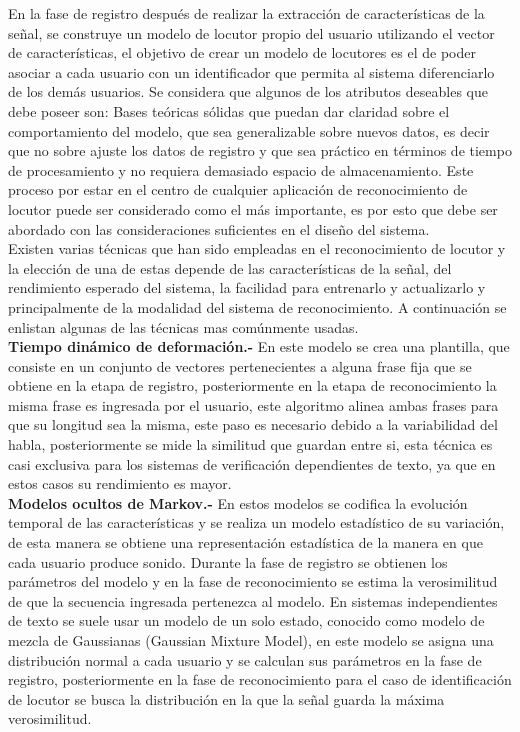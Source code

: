 En la fase de registro despu\'es de realizar la extracci\'on de caracter\'isticas de la señal, se construye un modelo de locutor propio del usuario utilizando el vector de caracter\'isticas, el objetivo de crear un modelo de locutores es el de poder asociar a cada usuario con un identificador que permita al sistema diferenciarlo de los dem\'as usuarios. Se considera que algunos de los atributos deseables que debe poseer son: Bases te\'oricas s\'olidas que puedan dar claridad sobre el comportamiento del modelo, que sea generalizable sobre nuevos datos, es decir que no sobre ajuste los datos de registro y que sea pr\'actico en t\'erminos de tiempo de procesamiento y no requiera demasiado espacio de almacenamiento. Este proceso por estar en el centro de cualquier aplicaci\'on de reconocimiento de locutor puede ser considerado como el m\'as importante, es por esto que debe ser abordado con las consideraciones suficientes en el diseño del sistema.\\

Existen varias t\'ecnicas que han sido empleadas en el reconocimiento de locutor y la elecci\'on de una de estas depende de las caracter\'isticas de la señal, del rendimiento esperado del sistema, la facilidad para entrenarlo y actualizarlo y principalmente de la modalidad del sistema de reconocimiento. A continuaci\'on se enlistan algunas de las t\'ecnicas mas com\'unmente usadas.\\

\textbf{Tiempo din\'amico de deformaci\'on.- } En este modelo se crea una plantilla, que consiste en un conjunto de vectores pertenecientes a alguna frase fija que se obtiene en la etapa de registro, posteriormente en la etapa de reconocimiento la misma frase es ingresada por el usuario, este algoritmo alinea ambas frases para que su longitud sea la misma, este paso es necesario debido a la variabilidad del habla, posteriormente se mide la similitud que guardan entre si, esta t\'ecnica es casi exclusiva para los sistemas de verificaci\'on dependientes de texto, ya que en estos casos su rendimiento es mayor.\\

\textbf{Modelos ocultos de Markov.- } En estos modelos se codifica la evoluci\'on temporal de las caracter\'isticas y se realiza un modelo estad\'istico de su variaci\'on, de esta manera se obtiene una representaci\'on estad\'istica de la manera en que cada usuario produce sonido. Durante la fase de registro se obtienen los par\'ametros del modelo y en la fase de reconocimiento se estima la verosimilitud de que la secuencia ingresada pertenezca al modelo. En sistemas independientes de texto se suele usar un modelo de un solo estado, conocido como modelo de mezcla de Gaussianas (Gaussian Mixture Model), en este modelo se asigna una distribuci\'on normal a cada usuario y se calculan sus par\'ametros en la fase de registro, posteriormente en la fase de reconocimiento para el caso de identificaci\'on de locutor se busca la distribuci\'on en la que la señal guarda la m\'axima verosimilitud.\\

